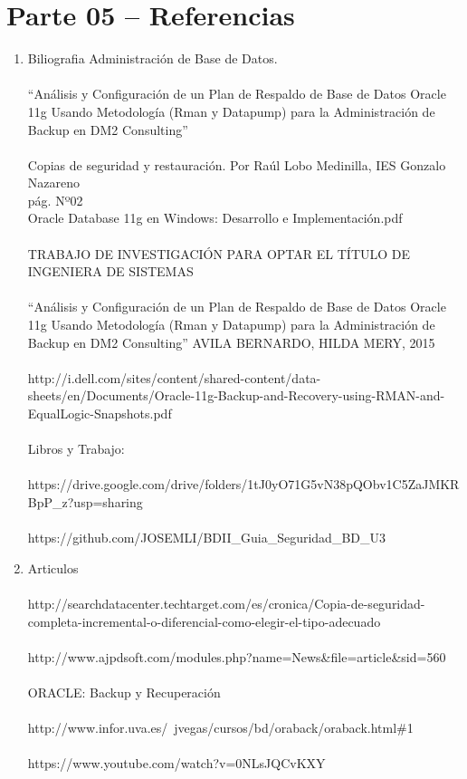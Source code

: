 \section{Parte 05 – Referencias} 

\begin{enumerate}[1.]
	\item Biliografia
	\subitem Administración de Base de Datos.
	\\\\“Análisis y Configuración de un Plan de Respaldo de Base de Datos Oracle 11g Usando Metodología (Rman y Datapump) para la Administración de Backup en DM2 Consulting”
	\\\\Copias de seguridad y restauración. Por Raúl Lobo Medinilla, IES Gonzalo Nazareno
	\\pág. Nº02
	\\Oracle Database 11g en Windows: Desarrollo e Implementación.pdf
	\\\\TRABAJO DE INVESTIGACIÓN PARA OPTAR EL TÍTULO DE INGENIERA DE SISTEMAS
	\\\\“Análisis y Configuración de un Plan de Respaldo de Base de Datos Oracle 11g Usando Metodología (Rman y Datapump) para la Administración de Backup en DM2 Consulting” AVILA BERNARDO, HILDA MERY, 2015
	\\\\http://i.dell.com/sites/content/shared-content/data-sheets/en/Documents/Oracle-11g-Backup-and-Recovery-using-RMAN-and-EqualLogic-Snapshots.pdf
	\\\\Libros y Trabajo: 
	\\\\https://drive.google.com/drive/folders/1tJ0yO71G5vN38pQObv1C5ZaJMKRBpP\_z?usp=sharing
	\\\\https://github.com/JOSEMLI/BDII\_Guia\_Seguridad\_BD\_U3

	\item Articulos
	\\\\http://searchdatacenter.techtarget.com/es/cronica/Copia-de-seguridad-completa-incremental-o-diferencial-como-elegir-el-tipo-adecuado
	\\\\http://www.ajpdsoft.com/modules.php?name=News\&file=article\&sid=560
	\\\\ORACLE: Backup y Recuperación 
	\\\\http://www.infor.uva.es/~jvegas/cursos/bd/oraback/oraback.html\#1
	\\\\https://www.youtube.com/watch?v=0NLsJQCvKXY
	

\end{enumerate} 
